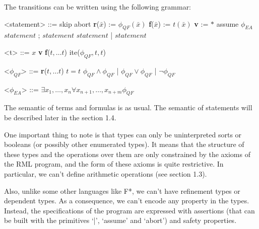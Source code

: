 \documentclass[11pt,a4paper,oldfontcommands,openany]{memoir}
\begin{document}
    The transitions can be written using the following grammar:
    \begin{multicols}{2}
        \begin{grammar}

            <statement> ::= skip
            \alt abort
            \alt \textbf{r}(\(\bar{x}\)) := \( \phi_{QF}(\bar{x}) \)
            \alt \textbf{f}(\(\bar{x}\)) := \( t(\bar{x}) \)
            \alt \textbf{v} := \( * \)
            \alt assume \( \phi_{EA} \)
            \alt \( statement \) ; \( statement \)
            \alt \( statement \) | \( statement \)
            
        \end{grammar}

        \columnbreak

        \begin{grammar}

            <t> ::= \(x\)
            \alt \textbf{v}
            \alt \textbf{f}(\(t,\ldots t\))
            \alt ite(\( \phi_{QF},t,t\))

            <\( \phi_{QF} \)> ::= \textbf{r}(\(t,\ldots t\))
            \alt \( t = t \)
            \alt \( \phi_{QF} \land \phi_{QF} \) \quad | \quad \( \phi_{QF} \lor \phi_{QF} \) \quad | \quad \( \neg \phi_{QF} \)
            
            <\( \phi_{EA} \)> ::= \( \exists x_1,\ldots,x_n \forall x_{n+1},\ldots,x_{n+m} \phi_{QF} \)

        \end{grammar}
    \end{multicols}

    The semantic of terms and formulas is as usual. The semantic of statements will be described later in the section 1.4.

    One important thing to note is that types can only be uninterpreted sorts or booleans (or possibly other enumerated types).
    It means that the structure of these types and the operations over them are only constrained by the axioms of the RML program,
    and the form of these axioms is quite restrictive.
    In particular, we can't define arithmetic operations (see section 1.3).

    Also, unlike some other languages like F*, we can't have refinement types or dependent types.
    As a consequence, we can't encode any property in the types.
    Instead, the specifications of the program are expressed with assertions (that can be built with the primitives `|', `assume' and `abort')
    and safety properties.
\end{document}
